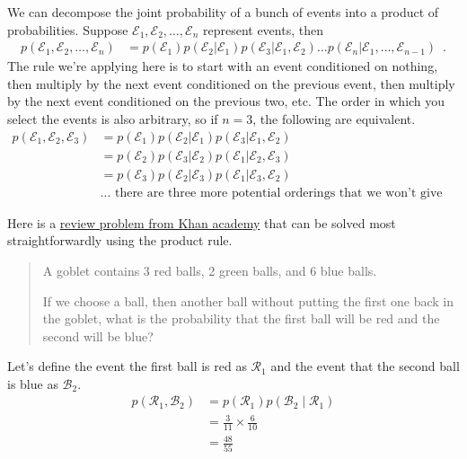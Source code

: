 \documentclass{tufte-handout}
\begin{document}
We can decompose the joint probability of a bunch of events into a product of probabilities.  Suppose $\mathcal{E}_1, \mathcal{E}_2, \ldots, \mathcal{E}_n$ represent events, then
\begin{align}
p(\mathcal{E}_1, \mathcal{E}_2, \ldots, \mathcal{E}_n) &= p(\mathcal{E}_1) p(\mathcal{E}_2 | \mathcal{E}_1) p(\mathcal{E}_3 | \mathcal{E}_1, \mathcal{E}_2) \ldots p(\mathcal{E}_n | \mathcal{E}_1, \ldots, \mathcal{E}_{n-1}) \enspace .
\end{align}
The rule we're applying here is to start with an event conditioned on nothing, then multiply by the next event conditioned on the previous event, then multiply by the next event conditioned on the previous two, etc.  The order in which you select the events is also arbitrary, so if $n=3$, the following are equivalent.
\begin{align}
p(\mathcal{E}_1, \mathcal{E}_2, \mathcal{E}_3) &= p(\mathcal{E}_1) p(\mathcal{E}_2|\mathcal{E}_1)p(\mathcal{E}_3|\mathcal{E}_1, \mathcal{E}_2) \nonumber \\
&= p(\mathcal{E}_2) p(\mathcal{E}_3|\mathcal{E}_2)p(\mathcal{E}_1|\mathcal{E}_2, \mathcal{E}_3) \nonumber \\
&= p(\mathcal{E}_3) p(\mathcal{E}_2|\mathcal{E}_3)p(\mathcal{E}_1|\mathcal{E}_3, \mathcal{E}_2) \nonumber \\
&\mbox{... there are three more potential orderings that we won't give explicitly} \nonumber
\end{align}

\begin{exercise}
Here is a \href{https://www.khanacademy.org/math/ap-statistics/probability-ap/probability-multiplication-rule/e/dependent\_probability}{review problem from Khan academy} that can be solved most straightforwardly using the product rule.

\begin{quote}
A goblet contains 3 red balls, 2 green balls, and 6 blue balls.

If we choose a ball, then another ball without putting the first one back in the goblet, what is the probability that the first ball will be red and the second will be blue?
\end{quote}
\begin{boxedsolution}
Let's define the event the first ball is red as $\mathcal{R}_1$ and the event that the second ball is blue as $\mathcal{B}_2$.
\begin{align}
p(\mathcal{R}_1, \mathcal{B}_2) &= p(\mathcal{R}_1) p(\mathcal{B}_2 \mid \mathcal{R}_1) \nonumber \\
&= \frac{3}{11} \times \frac{6}{10} \nonumber \\
&= \frac{48}{55} \nonumber
\end{align}
\end{boxedsolution}
\end{exercise}
\end{document}
